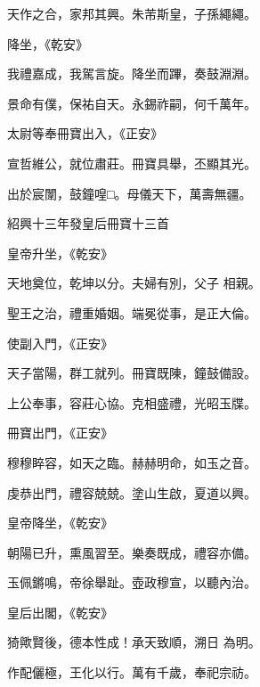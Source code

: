 \begin{pinyinscope}
 天作之合，家邦其興。朱芾斯皇，子孫繩繩。



 降坐，《乾安》



 我禮嘉成，我駕言旋。降坐而蹕，奏鼓淵淵。



 景命有僕，保祐自天。永錫祚嗣，何千萬年。



 太尉等奉冊寶出入，《正安》



 宣哲維公，就位肅莊。冊寶具舉，丕顯其光。



 出於宸闈，鼓鐘喤□。母儀天下，萬壽無疆。



 紹興十三年發皇后冊寶十三首



 皇帝升坐，《乾安》



 天地奠位，乾坤以分。夫婦有別，父子
 相親。



 聖王之治，禮重婚姻。端冕從事，是正大倫。



 使副入門，《正安》



 天子當陽，群工就列。冊寶既陳，鐘鼓備設。



 上公奉事，容莊心協。克相盛禮，光昭玉牒。



 冊寶出門，《正安》



 穆穆睟容，如天之臨。赫赫明命，如玉之音。



 虔恭出門，禮容兢兢。塗山生啟，夏道以興。



 皇帝降坐，《乾安》



 朝陽已升，熏風習至。樂奏既成，禮容亦備。



 玉佩鏘鳴，帝徐舉趾。壺政穆宣，以聽內治。



 皇后出閣，《乾安》



 猗歟賢後，德本性成！承天致順，溯日
 為明。



 作配儷極，王化以行。萬有千歲，奉祀宗祊。




\end{pinyinscope}
